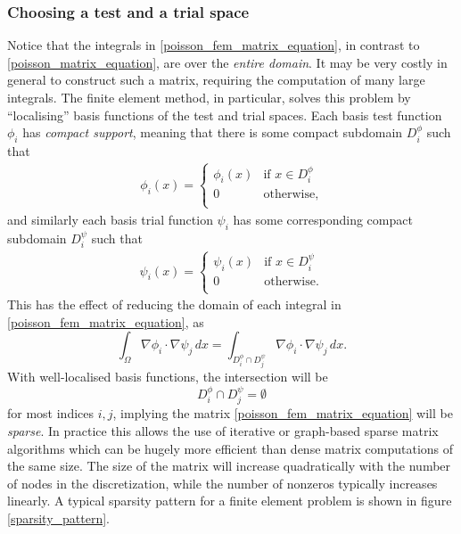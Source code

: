 \subsubsection{Choosing a test and a trial space}
Notice that the integrals in \eqref{poisson_fem_matrix_equation}, in contrast to \eqref{poisson_matrix_equation},
are over the \textit{entire domain}. It may be very costly in general to construct such a matrix, requiring
the computation of many large integrals. The finite element method, in particular, solves this problem
by ``localising'' basis functions of the test and trial spaces. Each basis test function $\phi_i$
has \textit{compact support}, meaning that there is some compact subdomain $D^\phi_i$ such that
\begin{align*}
    \phi_i(x) =
    \left\{\begin{array}{lr}
        \phi_i(x) &\text{if $x \in D^\phi_i$}\\
        0 &\text{otherwise},\\
    \end{array}\right.
\end{align*}
and similarly each basis trial function $\psi_i$ has some corresponding compact subdomain $D^\psi_i$ such that
\begin{align*}
    \psi_i(x) =
    \left\{\begin{array}{lr}
        \psi_i(x) &\text{if $x \in D^\psi_i$}\\
        0 &\text{otherwise}.\\
    \end{array}\right.
\end{align*}
This has the effect of reducing the domain of each integral in \eqref{poisson_fem_matrix_equation}, as
    $$\int_\Omega \nabla\phi_i \cdot \nabla\psi_j\,dx = \int_{D_i^\phi \cap D_j^\psi} \nabla\phi_i \cdot \nabla\psi_j\,dx. $$
With well-localised basis functions, the intersection will be
    $$D_i^\phi \cap D_j^\psi = \emptyset$$
for most indices $i,j$, implying the matrix \eqref{poisson_fem_matrix_equation} will be \textit{sparse}. In practice this allows
the use of iterative or graph-based sparse matrix algorithms which can be hugely more efficient than dense matrix computations of the same size.
The size of the matrix will increase quadratically with the number of nodes in the discretization, while the number of nonzeros
typically increases linearly.
A typical sparsity pattern for a finite element problem is shown in figure \ref{sparsity_pattern}.

